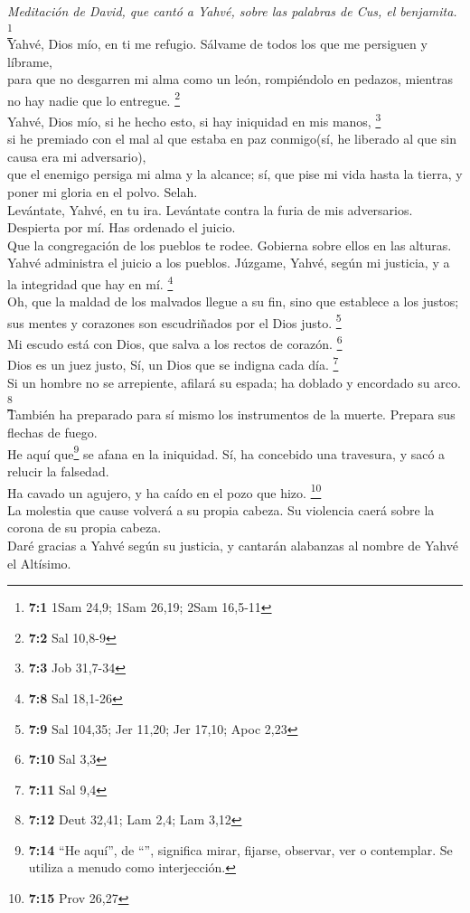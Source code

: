\emph{Meditación de David, que cantó a Yahvé, sobre las palabras de Cus,
el benjamita.} \footnote{\textbf{7:1} 1Sam 24,9; 1Sam 26,19; 2Sam
  16,5-11}\\
 Yahvé, Dios mío, en ti me refugio. Sálvame de todos los
que me persiguen y líbrame,\\
 para que no desgarren mi alma como un león, rompiéndolo
en pedazos, mientras no hay nadie que lo entregue. \footnote{\textbf{7:2}
  Sal 10,8-9}\\
 Yahvé, Dios mío, si he hecho esto, si hay iniquidad en
mis manos, \footnote{\textbf{7:3} Job 31,7-34}\\
 si he premiado con el mal al que estaba en paz
conmigo(sí, he liberado al que sin causa era mi adversario),\\
 que el enemigo persiga mi alma y la alcance; sí, que pise
mi vida hasta la tierra, y poner mi gloria en el polvo. Selah.\\
 Levántate, Yahvé, en tu ira. Levántate contra la furia de
mis adversarios. Despierta por mí. Has ordenado el juicio.\\
 Que la congregación de los pueblos te rodee. Gobierna
sobre ellos en las alturas.\\
 Yahvé administra el juicio a los pueblos. Júzgame, Yahvé,
según mi justicia, y a la integridad que hay en mí. \footnote{\textbf{7:8}
  Sal 18,1-26}\\
 Oh, que la maldad de los malvados llegue a su fin, sino
que establece a los justos; sus mentes y corazones son escudriñados por
el Dios justo. \footnote{\textbf{7:9} Sal 104,35; Jer 11,20; Jer 17,10;
  Apoc 2,23}\\
 Mi escudo está con Dios, que salva a los rectos de
corazón. \footnote{\textbf{7:10} Sal 3,3}\\
 Dios es un juez justo, Sí, un Dios que se indigna cada
día. \footnote{\textbf{7:11} Sal 9,4}\\
 Si un hombre no se arrepiente, afilará su espada; ha
doblado y encordado su arco. \footnote{\textbf{7:12} Deut 32,41; Lam
  2,4; Lam 3,12}\\
 También ha preparado para sí mismo los instrumentos de
la muerte. Prepara sus flechas de fuego.\\
 He aquí que\footnote{\textbf{7:14} ``He aquí'', de
  ``'', significa mirar, fijarse, observar, ver o
  contemplar. Se utiliza a menudo como interjección.} se afana en la
iniquidad. Sí, ha concebido una travesura, y sacó a relucir la
falsedad.\\
 Ha cavado un agujero, y ha caído en el pozo que hizo.
\footnote{\textbf{7:15} Prov 26,27}\\
 La molestia que cause volverá a su propia cabeza. Su
violencia caerá sobre la corona de su propia cabeza.\\
 Daré gracias a Yahvé según su justicia, y cantarán
alabanzas al nombre de Yahvé el Altísimo.

